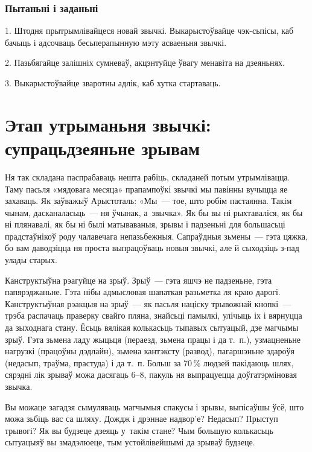 \subsubsection{Пытаньні і заданьні}

1. Штодня прытрымлівайцеся новай звычкі. Выкарыстоўвайце чэк-сьпісы, каб бачыць і адсочваць бесьперапынную мэту асваеньня звычкі.

2. Пазьбягайце залішніх сумневаў, акцэнтуйце ўвагу менавіта на дзеяньнях.

3. Выкарыстоўвайце зваротны адлік, каб хутка стартаваць.


\section{Этап утрыманьня звычкі: супрацьдзеяньне зрывам}

Ня так складана паспрабаваць нешта рабіць, складаней потым утрымлівацца. Таму пасьля «мядовага месяца» прапампоўкі звычкі мы павінны вучыцца яе захаваць. Як заўважыў Арыстоталь: «Мы~--- тое, што робім пастаянна. Такім чынам, дасканаласьць~--- ня ўчынак, а~звычка». Як бы вы ні рыхтаваліся, як бы ні плянавалі, як бы ні былі матываваныя, зрывы і падзеньні для большасьці прадстаўнікоў роду чалавечага непазьбежныя. Сапраўдныя зьмены~--- гэта цяжка, бо вам даводзіцца ня проста выпрацоўваць новыя звычкі, але й сыходзіць з-пад улады старых.

Канструктыўна рэагуйце на зрыў. Зрыў~--- гэта яшчэ не падзеньне, гэта папярэджаньне. Гэта нібы адмысловая шапаткая разьметка ля краю дарогі. Канструктыўная рэакцыя на зрыў~--- як пасьля націску трывожнай кнопкі~--- трэба распачаць праверку свайго пляна, знайсьці памылкі, улічыць іх і вярнуцца да зыходнага стану. Ёсьць вялікая колькасьць тыпавых сытуацый, дзе магчымы зрыў. Гэта зьмена ладу жыцьця (пераезд, зьмена працы і да т.~п.), узмацненьне нагрузкі (працоўны дэдлайн), зьмена кантэксту (развод), пагаршэньне здароўя (недасып, траўма, прастуда) і да т.~п. Больш за 70\,\% людзей пакідаюць шлях, сярэдні лік зрываў можа дасягаць 6--8, пакуль ня выпрацуецца доўгатэрміновая звычка.

Вы можаце загадзя сымуляваць магчымыя спакусы і зрывы, выпісаўшы ўсё, што можа зьбіць вас са шляху. Дождж і дрэннае надвор'е? Недасып? Прыступ трывогі? Як вы будзеце дзеяць у~такім стане? Чым большую колькасьць сытуацыяў вы змадэлюеце, тым устойлівейшымі да зрываў будзеце.

